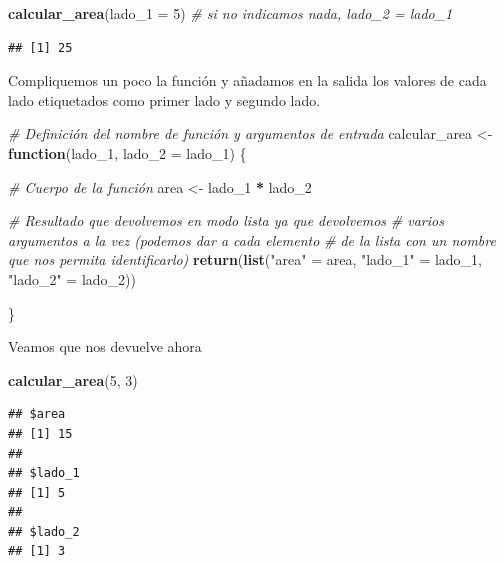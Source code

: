 \documentclass[11pt,]{book}
\newenvironment{Shaded}{\begin{snugshade}}{\end{snugshade}}
\newcommand{\CommentTok}[1]{\textcolor[rgb]{0.37,0.37,0.37}{\textit{#1}}}
\newcommand{\ControlFlowTok}[1]{\textcolor[rgb]{0.27,0.27,0.27}{\textbf{#1}}}
\newcommand{\DataTypeTok}[1]{\textcolor[rgb]{0.27,0.27,0.27}{#1}}
\newcommand{\DecValTok}[1]{\textcolor[rgb]{0.06,0.06,0.06}{#1}}
\newcommand{\KeywordTok}[1]{\textcolor[rgb]{0.27,0.27,0.27}{\textbf{#1}}}
\newcommand{\NormalTok}[1]{#1}
\newcommand{\OperatorTok}[1]{\textcolor[rgb]{0.43,0.43,0.43}{\textbf{#1}}}
\newcommand{\StringTok}[1]{\textcolor[rgb]{0.5,0.5,0.5}{#1}}
\begin{document}
\begin{Shaded}
\begin{Highlighting}[]
\KeywordTok{calcular_area}\NormalTok{(}\DataTypeTok{lado_1 =} \DecValTok{5}\NormalTok{) }\CommentTok{# si no indicamos nada, lado_2 = lado_1}
\end{Highlighting}
\end{Shaded}

\begin{verbatim}
## [1] 25
\end{verbatim}

Compliquemos un poco la función y añadamos en la salida los valores de cada lado etiquetados como primer lado y segundo lado.

\begin{Shaded}
\begin{Highlighting}[]
\CommentTok{# Definición del nombre de función y argumentos de entrada}
\NormalTok{calcular_area <-}\StringTok{ }\ControlFlowTok{function}\NormalTok{(lado_}\DecValTok{1}\NormalTok{, }\DataTypeTok{lado_2 =}\NormalTok{ lado_}\DecValTok{1}\NormalTok{) \{}
  
  \CommentTok{# Cuerpo de la función}
\NormalTok{  area <-}\StringTok{ }\NormalTok{lado_}\DecValTok{1} \OperatorTok{*}\StringTok{ }\NormalTok{lado_}\DecValTok{2}
  
  \CommentTok{# Resultado que devolvemos en modo lista ya que devolvemos}
  \CommentTok{# varios argumentos a la vez (podemos dar a cada elemento }
  \CommentTok{# de la lista con un nombre que nos permita identificarlo)}
  \KeywordTok{return}\NormalTok{(}\KeywordTok{list}\NormalTok{(}\StringTok{"area"}\NormalTok{ =}\StringTok{ }\NormalTok{area, }\StringTok{"lado_1"}\NormalTok{ =}\StringTok{ }\NormalTok{lado_}\DecValTok{1}\NormalTok{, }\StringTok{"lado_2"}\NormalTok{ =}\StringTok{ }\NormalTok{lado_}\DecValTok{2}\NormalTok{))}
  
\NormalTok{\}}
\end{Highlighting}
\end{Shaded}

Veamos que nos devuelve ahora

\begin{Shaded}
\begin{Highlighting}[]
\KeywordTok{calcular_area}\NormalTok{(}\DecValTok{5}\NormalTok{, }\DecValTok{3}\NormalTok{)}
\end{Highlighting}
\end{Shaded}

\begin{verbatim}
## $area
## [1] 15
## 
## $lado_1
## [1] 5
## 
## $lado_2
## [1] 3
\end{verbatim}
\end{document}
